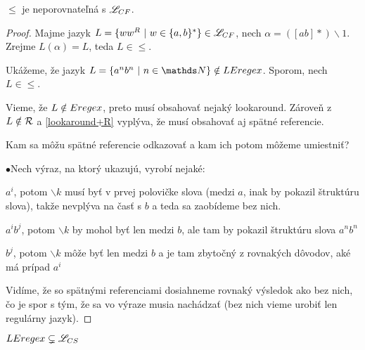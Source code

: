 \begin{veta}\label{lelcf}
$\le$ je neporovnateľná s $ \mathscr{L}_{CF}$.
\end{veta}
\begin{proof}
Majme jazyk $L=\lbrace ww^R~|~w \in \lbrace a,b \rbrace^* \rbrace \in \mathscr{L}_{CF}$, nech $ \alpha = ([ab]*)\backslash 1 $.
Zrejme $ L(\alpha) = L $, teda $L\in \le$.

Ukážeme, že jazyk $L=\lbrace a^nb^n~|~n \in \N \rbrace \notin \le$. Sporom, nech $L \in \le$. 

Vieme, že $L \notin Eregex$, preto musí obsahovať nejaký lookaround. Zároveň z $L \notin {\cal R}$ a \ref{lookaround+R} vyplýva, že musí obsahovať aj spätné referencie.

Kam sa môžu spätné referencie odkazovať a kam ich potom môžeme umiestniť?
\begin{list}{$\bullet$}{Nech výraz, na ktorý ukazujú, vyrobí nejaké:}
\item $a^i$, potom $\backslash k$ musí byť v prvej polovičke slova (medzi $a$, inak by pokazil štruktúru slova), takže nevplýva na časť s $b$ a teda sa zaobídeme bez nich.
\item $a^ib^j$, potom $\backslash k$ by mohol byť len medzi $b$, ale tam by pokazil štruktúru slova $a^nb^n$
\item $b^j$, potom $\backslash k$ môže byť len medzi $b$ a je tam zbytočný z rovnakých dôvodov, aké má prípad $a^i$
\end{list}
Vidíme, že so spätnými referenciami dosiahneme rovnaký výsledok ako bez nich, čo je spor s tým, že sa vo výraze musia nachádzať (bez nich vieme urobiť len regulárny jazyk).
\end{proof}

\begin{dosledok}
$LEregex \subsetneq \mathscr{L}_{CS}$
\end{dosledok}

